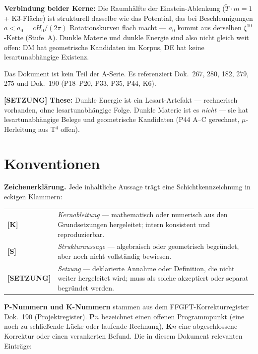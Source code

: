 \documentclass[11pt]{report}
\begin{document}
\medskip
\noindent\textbf{Verbindung beider Kerne:} Die Raumhälfte der Einstein-Ablenkung
($\tilde T \cdot m = 1$ + K3-Fläche) ist strukturell dasselbe wie das
Potential, das bei Beschleunigungen $a < a_0 = cH_0/(2\pi)$ Rotationskurven
flach macht — $a_0$ kommt aus derselben $\xi^{10}$-Kette (Stufe~A).
Dunkle Materie und dunkle Energie sind also nicht gleich weit offen:
DM hat geometrische Kandidaten im Korpus, DE hat keine lesartunabhängige
Existenz.

Das Dokument ist kein Teil der A-Serie. Es referenziert Dok.~267, 280,
182, 279, 275 und Dok.~190 (P18--P20, P33, P35, P44, K6).

\medskip
\noindent\textbf{[SETZUNG] These:} Dunkle Energie ist ein Lesart-Artefakt —
rechnerisch vorhanden, ohne lesartunabhängige Folge. Dunkle Materie ist
es \emph{nicht} — sie hat lesartunabhängige Belege und geometrische
Kandidaten (P44 A–C gerechnet, $\mu$-Herleitung aus T$^4$ offen).

\section*{Konventionen}

\noindent\textbf{Zeichenerklärung.} Jede inhaltliche Aussage trägt eine
Schicht\-kennzeichnung in eckigen Klammern:

\medskip
\begin{tabular}{@{}lp{11cm}}
\textbf{[K]}       & \emph{Kernableitung} — mathematisch oder numerisch
                     aus den Grundsetzungen hergeleitet; intern konsistent
                     und reproduzierbar. \\[4pt]
\textbf{[S]}       & \emph{Strukturaussage} — algebraisch oder geometrisch
                     begründet, aber noch nicht vollständig bewiesen. \\[4pt]
\textbf{[SETZUNG]} & \emph{Setzung} — deklarierte Annahme oder Definition,
                     die nicht weiter hergeleitet wird; muss als solche
                     akzeptiert oder separat begründet werden. \\
\end{tabular}

\medskip
\noindent\textbf{P-Nummern und K-Nummern} stammen aus dem FFGFT-Korrekturregister
Dok.~190 (Projekt\-register). \textbf{P}$n$ bezeichnet einen offenen
Programmpunkt (eine noch zu schließende Lücke oder laufende Rechnung),
\textbf{K}$n$ eine abgeschlossene Korrektur oder einen verankerten Befund.
Die in diesem Dokument relevanten Einträge:
\end{document}
